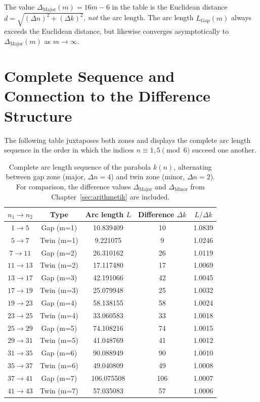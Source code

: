 \begin{bemerkung}
The value $\Delta_{\mathrm{Major}}(m) = 16m-6$ in the table is the
Euclidean distance $d = \sqrt{(\Delta n)^2 + (\Delta k)^2}$, \emph{not}
the arc length. The arc length $L_{\mathrm{Gap}}(m)$ always exceeds the
Euclidean distance, but likewise converges asymptotically to
$\Delta_{\mathrm{Major}}(m)$ as $m \to \infty$.
\end{bemerkung}

\section{Complete Sequence and Connection to the Difference Structure}
\label{sec:bl_gesamtsequenz}

The following table juxtaposes both zones and displays the complete
arc length sequence in the order in which the indices $n \equiv 1,5 \pmod 6$
succeed one another.

\begin{table}[H]
\centering
\caption{Complete arc length sequence of the parabola $k(n)$, alternating
  between gap zone (major, $\Delta n = 4$) and twin zone (minor, $\Delta n = 2$).
  For comparison, the difference values $\Delta_{\mathrm{Major}}$ and
  $\Delta_{\mathrm{Minor}}$ from Chapter~\ref{sec:arithmetik} are included.}
\renewcommand{\arraystretch}{1.25}
\begin{tabular}{ccccc}
\toprule
$n_1 \to n_2$ & Type & Arc length $L$ & Difference $\Delta k$ & $L / \Delta k$ \\
\midrule
 $1 \to  5$ & Gap  (m=1) & 10.839409 & 10 & 1.0839 \\
 $5 \to  7$ & Twin (m=1) &  9.221075 &  9 & 1.0246 \\
 $7 \to 11$ & Gap  (m=2) & 26.310162 & 26 & 1.0119 \\
$11 \to 13$ & Twin (m=2) & 17.117480 & 17 & 1.0069 \\
$13 \to 17$ & Gap  (m=3) & 42.191066 & 42 & 1.0045 \\
$17 \to 19$ & Twin (m=3) & 25.079948 & 25 & 1.0032 \\
$19 \to 23$ & Gap  (m=4) & 58.138155 & 58 & 1.0024 \\
$23 \to 25$ & Twin (m=4) & 33.060583 & 33 & 1.0018 \\
$25 \to 29$ & Gap  (m=5) & 74.108216 & 74 & 1.0015 \\
$29 \to 31$ & Twin (m=5) & 41.048769 & 41 & 1.0012 \\
$31 \to 35$ & Gap  (m=6) & 90.088949 & 90 & 1.0010 \\
$35 \to 37$ & Twin (m=6) & 49.040809 & 49 & 1.0008 \\
$37 \to 41$ & Gap  (m=7) & 106.075508 & 106 & 1.0007 \\
$41 \to 43$ & Twin (m=7) & 57.035083 & 57 & 1.0006 \\
\bottomrule
\end{tabular}
\end{table}

